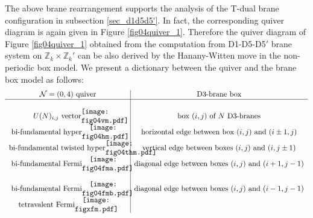 \documentclass{article}
\numberwithin{equation}{section}
\begin{document}
The above brane rearrangement supports the analysis of the T-dual brane configuration 
in subsection \ref{sec_d1d5d5'}. 
In fact, the corresponding quiver diagram is again given in Figure \ref{fig04quiver_1}. 
Therefore the quiver diagram of Figure \ref{fig04quiver_1} obtained from 
the computation from D1-D5-D5$'$ brane system on $\mathbb{Z}_{k}\times \mathbb{Z}_{k}'$ can be also derived 
by the Hanany-Witten move in the non-periodic box model. 
We present a dictionary between the quiver and the brane box model as follows:
\begin{align}
\label{dic_box}
\begin{array}{c|c}
\textrm{$\mathcal{N}=(0,4)$ quiver}&\textrm{D3-brane box}\\ \hline 
& \\ 
\textrm{$U(N)_{i,j}$ vector} 
\begin{minipage}{1truecm}
\centering
\texttt{[image: fig04vm.pdf]}
\end{minipage}
&\textrm{box  $(i,j)$ of $N$ D3-branes} \\ 
\textrm{bi-fundamental hyper}
\begin{minipage}{2truecm}
\centering
\texttt{[image: fig04hm.pdf]}
\end{minipage}
& \textrm{horizontal edge between box $(i,j)$ and $(i\pm1, j)$} \\
\textrm{bi-fundamental twisted hyper}
\begin{minipage}{1truecm}
\centering
\texttt{[image: fig04thm.pdf]}
\end{minipage}
&\textrm{vertical edge between boxes $(i,j)$ and $(i, j\pm 1)$}\\
\textrm{bi-fundamental Fermi} 
\begin{minipage}{2truecm}
\centering
\texttt{[image: fig04fma.pdf]}
\end{minipage}
& \textrm{diagonal edge between boxes $(i,j)$ and $(i+1,j-1)$}\\
&\\
\textrm{bi-fundamental Fermi}
\begin{minipage}{2truecm}
\centering
\texttt{[image: fig04fmb.pdf]}
\end{minipage}
& \textrm{diagonal edge between boxes $(i,j)$ and $(i-1, j-1)$}\\ 
\textrm{tetravalent Fermi}
\begin{minipage}{2truecm}
\centering
\texttt{[image: figxfm.pdf]}

\end{minipage}
\end{array}
\end{align}
\end{document}
